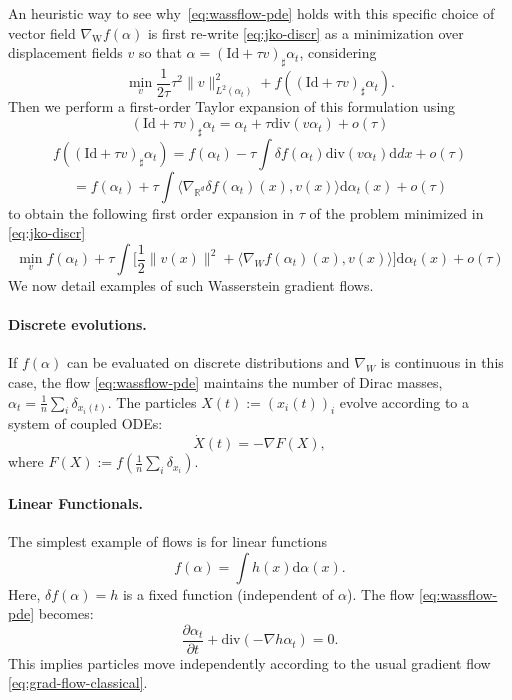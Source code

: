 An heuristic way to see why~\eqref{eq:wassflow-pde} holds with this specific choice of vector field $\nabla_{\mathrm{W}} f(\alpha)$ is first re-write \eqref{eq:jko-discr} as a minimization over displacement fields $v$ so that $\alpha = (\mathrm{Id} + \tau v)_\sharp \alpha_t$, considering
$$
	\min_{v} \frac{1}{2 \tau} \tau^2 \|v\|_{L^2(\alpha_t)}^2 + f( (\mathrm{Id} + \tau v)_\sharp \alpha_t ).
$$
Then we perform a first-order Taylor expansion of this formulation using 
$$
	 (\mathrm{Id} + \tau v)_\sharp \alpha_t =  \alpha_t + \tau \mathrm{div}( v \alpha_t ) + o(\tau)
$$
$$
	f( (\mathrm{Id} + \tau v)_\sharp \alpha_t ) = f(\alpha_t) - \tau \int \delta f(\alpha_t) \mathrm{div}( v \alpha_t ) \mathrm{d} d x + o(\tau)
$$
$$
	 = f(\alpha_t) + \tau \int \langle \nabla_{\mathbb{R}^d} \delta f(\alpha_t)(x), v(x) \rangle \mathrm{d} \alpha_t(x) + o(\tau)
$$
to obtain the following first order expansion in $\tau$ of the problem minimized in  \eqref{eq:jko-discr}
$$
	 \min_{v} f(\alpha_t) +  \tau \int \Big[ \frac{1}{2} \|v(x)\|^2 + \langle \nabla_{W} f(\alpha_t)(x), v(x) \rangle \Big]\mathrm{d} \alpha_t(x) + o(\tau)
$$
We now detail examples of such Wasserstein gradient flows.

\paragraph{Discrete evolutions.}

If $f(\alpha)$ can be evaluated on discrete distributions and $\nabla_W$ is continuous in this case, the flow \eqref{eq:wassflow-pde} maintains the number of Dirac masses, $\alpha_t = \frac{1}{n} \sum_i \delta_{x_i(t)}$. The particles $X(t) := (x_i(t))_i$ evolve according to a system of coupled ODEs:
\begin{equation}
    \dot{X}(t) = -\nabla F(X), \label{eq:wassflows-particles}
\end{equation}
where $F(X) := f\left(\frac{1}{n} \sum_i \delta_{x_i}\right)$.
 
\paragraph{Linear Functionals.} The simplest example of flows is for linear functions
   \begin{equation}\label{eq:linear-func}
       f(\alpha) = \int h(x) \mathrm{d} \alpha(x). 
   \end{equation}
   Here, $\delta f(\alpha) = h$ is a fixed function (independent of $\alpha$). The flow \eqref{eq:wassflow-pde} becomes:
   \begin{equation*}
       \frac{\partial \alpha_t}{\partial t} + \mathrm{div}(-\nabla h \alpha_t) = 0.
   \end{equation*}
   This implies particles move independently according to the usual gradient flow \eqref{eq:grad-flow-classical}.


